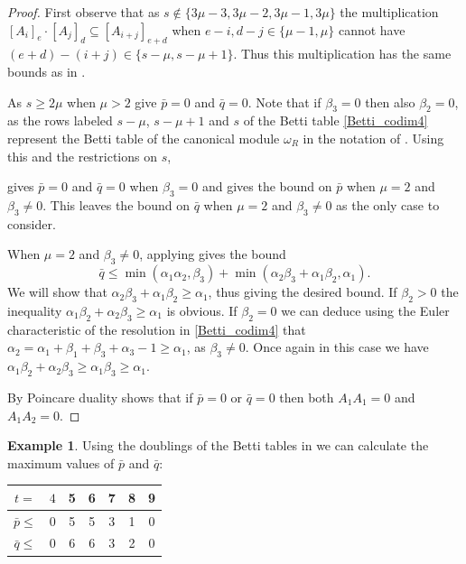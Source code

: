 \documentclass[reqno]{amsart}
\newcommand{\sube}{\subseteq}
\theoremstyle{plain} %
\theoremstyle{definition}
\newtheorem{example}[theorem]{Example}
\theoremstyle{remark}
\begin{document}
\begin{proof}  First observe that as $s\notin\{3\mu-3,3\mu-2,3\mu-1,3\mu\}$ the multiplication $[A_i]_e\cdot [A_j]_d\sube [A_{i+j}]_{e+d}$ when $e-i,d-j\in\{\mu-1,\mu\}$ cannot have $(e+d)-(i+j)\in\{s-\mu,s-\mu+1\}$. Thus this multiplication has the same bounds as in . 
   
    As $s\geq 2\mu$
    when $\mu>2$   give $\bar p=0$ and $\bar q=0$.
    Note that if $\beta_3 =0$ then also $\beta_2=0$, as the rows labeled $s-\mu$, $s-\mu+1$ and $s$ of the Betti table \eqref{Betti_codim4} represent the Betti table of the canonical module $\omega_{R}$ in the notation of . 
    Using this and the restrictions on $s$,
    
     gives $\bar p =0$ and $\bar q =0$ when $\beta_3 =0$ and gives the bound on $\bar p$ when $\mu =2$ and $\beta_3\neq 0$. 
    This leaves the bound on $\bar q$ when $\mu=2$ and $\beta_3\neq 0$ as the only case to consider.  

    When $\mu=2$ and $\beta_3\neq 0$, applying  gives the bound 
    \[\bar q\leq \min(\alpha_1\alpha_2,\beta_3)+\min(\alpha_2\beta_3+\alpha_1\beta_2,\alpha_1).
    \]
   We will show that $\alpha_2\beta_3+\alpha_1\beta_2\geq \alpha_1$, thus giving the desired bound.
    If  $\beta_2>0$ the inequality $\alpha_1\beta_2+\alpha_2\beta_3 \geq \alpha_1$ is obvious. If 
    $\beta_2=0$ we can deduce using the Euler characteristic of the resolution in  \eqref{Betti_codim4} that $\alpha_2=\alpha_1+\beta_1+\beta_3+\alpha_3-1\geq \alpha_1$, as $\beta_3\neq 0$. Once again in this case we have $\alpha_1\beta_2+\alpha_2\beta_3 \geq \alpha_1\beta_3 \geq \alpha_1$.
    
    By Poincare duality  shows that if $\bar p=0$ or $\bar q=0$ then both $A_1A_1=0$ and $A_1A_2=0$. 

\end{proof}


\begin{example}\label{ex: codim 4 p q bounds}
    Using the doublings of the Betti tables in  we can calculate the maximum values of $\bar p$ and $\bar q$: 
 
 
\begin{center}
\begin{tabular}{c|c c c c c c}
        $t=$& $4$&5&6&7&8&9\\
    \hline
     $\bar p \leq$& 0&5&5&3&1&0  \\
     $\bar q\leq$& 0&6&6&3&2&0
\end{tabular}
\end{center}
\end{example}
\end{document}
